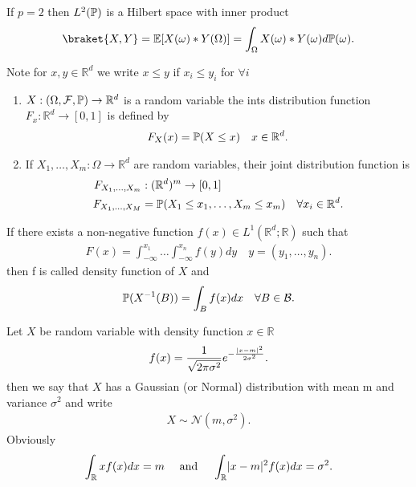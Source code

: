 \begin{remark}
 If $p=2$ then $L^{2}(\P) $ is a Hilbert space with inner product 
 \begin{align*}
   \braket{X,Y} = \E[X(\omega )*Y(\Omega )] = \int_{\Omega }X(\omega )*Y(\omega )d\P(\omega )
 .\end{align*}
\end{remark}
\begin{definition}
 Note for $x,y \in  \mathbb{R}^{d} $  we write $x\le y$ if $x_i \le  y_i$ for $\forall i$
 \begin{enumerate}
   \item $X: (\Omega ,\mathcal{F},\P) \to \mathbb{R}^{d} $ is a random variable the ints distribution function $F_x : \mathbb{R}^{d} \to [0,1] $
     is defined by 
     \begin{align*}
      F_X(x) = \P(X\le x) \quad x \in  \mathbb{R}^{d} 
     .\end{align*}
    \item If $X_{1},\ldots ,X_m : \Omega \to \mathbb{R}^{d} $ are random variables, their joint distribution function is
      \begin{align*}
        F_{X_{1},\ldots ,X_m} &: (\mathbb{R}^{d} )^m \to [0,1]\\
        F_{X_{1},\ldots ,X_M} &= \P(X_{1}\le x_{1},\ldots ,X_m\le x_m) \quad \forall x_i \in \mathbb{R}^{d} 
      .\end{align*}
 \end{enumerate}
\end{definition}
\begin{definition}
 If there exists a non-negative function $f(x) \in  L^{1}(\mathbb{R}^{d} ; \mathbb{R} ) $   such that 
 \begin{align*}
   F(x) = \int_{-\infty}^{x_{1}}  \ldots \int_{-\infty}^{x_n} f(y) dy \quad y = (y_{1},\ldots ,y_n)
 .\end{align*}
 then f is called density function of $X$ and 
 \begin{align*}
  \P(X^{-1}(B) ) = \int_B f(x) dx \quad \forall  B \in  \mathcal{B}
 .\end{align*}
\end{definition}
\begin{example}
 Let $X$ be random variable with density function  $x \in  \mathbb{R}$
 \begin{align*}
 f(x) = \frac{1}{\sqrt{2\pi \sigma ^2}}e^{-\frac{\abs{x-m}^2}{2\sigma ^2}}  
 .\end{align*}
 then we say that $X$ has a Gaussian (or Normal) distribution with mean m and variance $\sigma^2$ and write
 \begin{align*}
  X \sim \mathcal{N}(m,\sigma^2)
 .\end{align*}
 Obviously 
 \begin{align*}
   \int_{\mathbb{R}} xf(x) dx = m \quad \text{ and } \quad \int_{\mathbb{R}}\abs{x-m}^2f(x) dx = \sigma^2
  .\end{align*}
\end{example}
